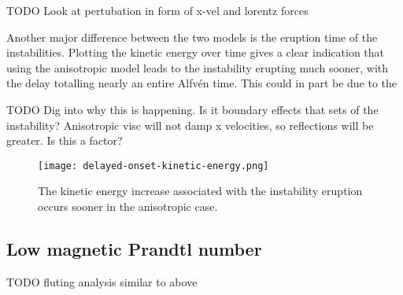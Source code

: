 TODO Look at pertubation in form of x-vel and lorentz forces

Another major difference between the two models is the eruption time of the instabilities. Plotting the kinetic energy over time gives a clear indication that using the anisotropic model leads to the instability erupting much sooner, with the delay totalling nearly an entire Alfv\'en time. This could in part be due to the 

TODO Dig into why this is happening. Is it boundary effects that sets of the instability? Anisotropic visc will not damp x velocities, so reflections will be greater. Is this a factor?

\begin{figure}[t]
  \centering
  \texttt{[image: delayed-onset-kinetic-energy.png]}
  \caption{The kinetic energy increase associated with the instability eruption occurs sooner in the anisotropic case.}
  \label{fig:delayed-onset-kinetic-energy}
\end{figure}

\subsection{Low magnetic Prandtl number}

TODO fluting analysis similar to above
